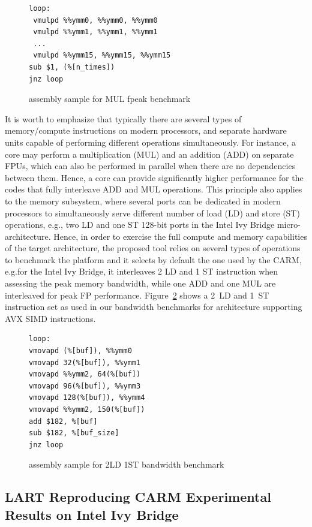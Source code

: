 \documentclass[twoside,twocolumn,8pt]{extarticle}
\begin{document}
\begin{figure}
  \centering
\begin{verbatim}
loop:
 vmulpd %%ymm0, %%ymm0, %%ymm0
 vmulpd %%ymm1, %%ymm1, %%ymm1
 ...
 vmulpd %%ymm15, %%ymm15, %%ymm15
sub $1, (%[n_times])
jnz loop
\end{verbatim}
\caption{assembly sample for MUL fpeak benchmark}
\label{src:fpeak}
\end{figure}

It is worth to emphasize that typically there are several types of memory/compute instructions on modern processors, and separate
hardware units capable of performing different operations simultaneously. For instance, a core
may perform a multiplication (MUL) and an addition (ADD) on separate FPUs, which  can also be performed in parallel when there are
no  dependencies between them. Hence, a core can provide significantly higher  performance for the codes that fully interleave ADD
and MUL operations. This principle also applies to the memory subsystem, where several ports can be dedicated in modern processors
to simultaneously serve different number of load (LD) and store (ST) operations, e.g., two LD and one ST 128-bit ports in the Intel
Ivy Bridge micro-architecture. Hence, in order to exercise the full  compute and memory capabilities of the target architecture,
the proposed tool relies on several types of operations to benchmark the platform and it selects by default the one used by
the CARM, e.g.for the Intel Ivy Bridge, it interleaves 2 LD and 1 ST instruction  when assessing the peak memory bandwidth, while
one ADD and one MUL are interleaved for peak FP performance.
Figure~\ref{src:bandwidth} shows a 2~LD and 1~ST instruction set as used in our bandwidth benchmarks for architecture supporting
AVX SIMD instructions.

\begin{figure}
  \centering
\begin{verbatim}
loop:
vmovapd (%[buf]), %%ymm0
vmovapd 32(%[buf]), %%ymm1
vmovapd %%ymm2, 64(%[buf])
vmovapd 96(%[buf]), %%ymm3
vmovapd 128(%[buf]), %%ymm4
vmovapd %%ymm2, 150(%[buf])
add $182, %[buf]
sub $182, %[buf_size]
jnz loop
\end{verbatim}
\caption{assembly sample for 2LD 1ST bandwidth benchmark}
\label{src:bandwidth}
\end{figure}

\subsection{LART Reproducing CARM Experimental Results on Intel Ivy Bridge}
\label{sub:CARM_reproduction}
\end{document}
